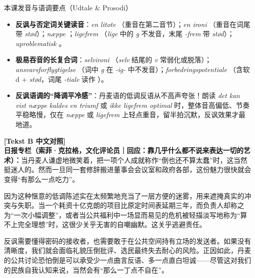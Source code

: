 \begin{tipbox}{本课发音与语调要点（Udtale \& Prosodi）}
\begin{itemize}
  \item \textbf{反讽与否定词关键读音}：\textit{en litote} （重音在第二音节）；\textit{en ironi} （重音在词尾带 \textit{stød}）；\textit{næppe} ；\textit{ligefrem} （\textit{lige} 中的 \textit{g} 不发音，末尾 \textit{-frem} 带 \textit{stød}）；\textit{uproblematisk} 。
  \item \textbf{极易吞音的长复合词}：\textit{selvironi} （\textit{selv} 结尾的 \textit{v} 常弱化或脱落）；\textit{ansvarsforflygtigelse} （词中 \textit{g} 在 \textit{-ig-} 中不发音）；\textit{forbedringspotentiale} （含软 d + \textit{stød}，词尾 \textit{-tiale} 读作 ）。
  \item \textbf{反讽语调的“降调平冷感”}：丹麦语的低调反语从不高声夸张！朗读 \textit{det kan vist næppe kaldes en triumf} 或 \textit{ikke ligefrem optimal} 时，整体音高偏低、节奏平稳略慢，仅在 \textit{næppe} 或 \textit{ligefrem} 上轻点重音，留半拍沉默，反讽效果才最地道。
\end{itemize}
\end{tipbox}

\begin{transbox}
\small
\textbf{\color{NCDTeal}[Tekst B 中文对照]}\\
\textbf{日报专栏（索菲·克拉格，文化评论员｜回应：靠几乎什么都不说来表达一切的艺术）：}当丹麦人谦虚地微笑着，把一项个人成就称作“倒也还不算太蠢”时，这当然挺迷人的。然而一旦同一套修辞搬进董事会会议室和政府各部，这份魅力很快就会变得“有那么一点吃力”。

因为这种惬意的低调陈述实在太频繁地充当了一层方便的迷雾，用来遮掩真实的冲突与失职。当一个耗资十亿克朗的项目比原定时间表延期三年，而负责人却称之为“一次小幅调整”，或者当公共福利中一场显而易见的危机被轻描淡写地称为“算不上完全理想”时，这很少关乎无害的自嘲幽默。这关乎逃避责任。

反讽需要懂得密码的接收者，也需要敢于在公共空间持有立场的发送者。如果没有清晰度，我们就会面临礼貌压倒批评、选民最终失去耐心的风险。正因如此，丹麦的公共讨论恐怕倒是可以承受少一点曲言反语、多一点直白坦诚——尽管这对我们的民族自我认知来说，当然会有“那么一丁点不自在”。
\end{transbox}


